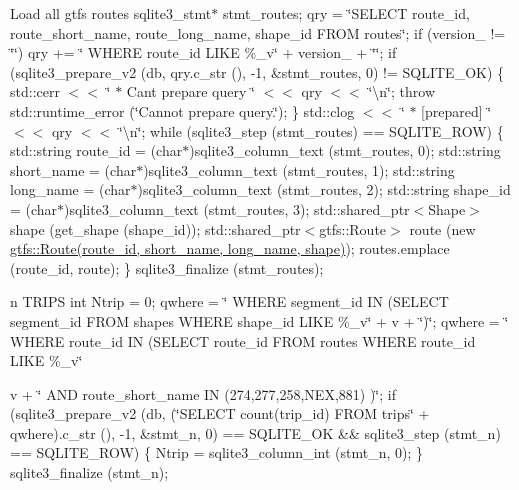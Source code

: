 Load all gtfs {\ttfamily routes} sqlite3\+\_\+stmt$\ast$ stmt\+\_\+routes; qry = \char`\"{}\+S\+E\+L\+E\+C\+T route\+\_\+id, route\+\_\+short\+\_\+name, route\+\_\+long\+\_\+name, shape\+\_\+id F\+R\+O\+M routes\char`\"{}; if (version\+\_\+ != \char`\"{}\char`\"{}) qry += \char`\"{} W\+H\+E\+R\+E route\+\_\+id L\+I\+K\+E \textquotesingle{}\%\+\_\+v\char`\"{} + version\+\_\+ + \char`\"{}\textquotesingle{}\char`\"{}; if (sqlite3\+\_\+prepare\+\_\+v2 (db, qry.\+c\+\_\+str (), -\/1, \&stmt\+\_\+routes, 0) != S\+Q\+L\+I\+T\+E\+\_\+\+OK) \{ std\+::cerr $<$$<$ \char`\"{} $\ast$ Can\textquotesingle{}t prepare query \char`\"{} $<$$<$ qry $<$$<$ \char`\"{}\textbackslash{}n\char`\"{}; throw std\+::runtime\+\_\+error (\char`\"{}\+Cannot prepare query.\char`\"{}); \} std\+::clog $<$$<$ \char`\"{} $\ast$ \mbox{[}prepared\mbox{]} \char`\"{} $<$$<$ qry $<$$<$ \char`\"{}\textbackslash{}n\char`\"{}; while (sqlite3\+\_\+step (stmt\+\_\+routes) == S\+Q\+L\+I\+T\+E\+\_\+\+R\+OW) \{ std\+::string route\+\_\+id = (char$\ast$)sqlite3\+\_\+column\+\_\+text (stmt\+\_\+routes, 0); std\+::string short\+\_\+name = (char$\ast$)sqlite3\+\_\+column\+\_\+text (stmt\+\_\+routes, 1); std\+::string long\+\_\+name = (char$\ast$)sqlite3\+\_\+column\+\_\+text (stmt\+\_\+routes, 2); std\+::string shape\+\_\+id = (char$\ast$)sqlite3\+\_\+column\+\_\+text (stmt\+\_\+routes, 3); std\+::shared\+\_\+ptr$<$\+Shape$>$ shape (get\+\_\+shape (shape\+\_\+id)); std\+::shared\+\_\+ptr$<$gtfs\+::\+Route$>$ route (new \hyperlink{classgtfs_1_1Route}{gtfs\+::\+Route(route\+\_\+id, short\+\_\+name, long\+\_\+name, shape)}); routes.\+emplace (route\+\_\+id, route); \} sqlite3\+\_\+finalize (stmt\+\_\+routes);

n T\+R\+I\+PS int Ntrip = 0; qwhere = \char`\"{} W\+H\+E\+R\+E segment\+\_\+id I\+N (\+S\+E\+L\+E\+C\+T segment\+\_\+id F\+R\+O\+M shapes W\+H\+E\+R\+E shape\+\_\+id L\+I\+K\+E \textquotesingle{}\%\+\_\+v\char`\"{} + v + \char`\"{}\textquotesingle{})\char`\"{}; qwhere = \char`\"{} W\+H\+E\+R\+E route\+\_\+id I\+N (\+S\+E\+L\+E\+C\+T route\+\_\+id F\+R\+O\+M routes W\+H\+E\+R\+E route\+\_\+id L\+I\+K\+E \textquotesingle{}\%\+\_\+v\char`\"{}
\begin{DoxyItemize}
\item v + \char`\"{}\textquotesingle{} A\+N\+D route\+\_\+short\+\_\+name I\+N (\textquotesingle{}274\textquotesingle{},\textquotesingle{}277\textquotesingle{},\textquotesingle{}258\textquotesingle{},\textquotesingle{}\+N\+E\+X\textquotesingle{},\textquotesingle{}881\textquotesingle{}) )\char`\"{}; if (sqlite3\+\_\+prepare\+\_\+v2 (db, (\char`\"{}\+S\+E\+L\+E\+C\+T count(trip\+\_\+id) F\+R\+O\+M trips\char`\"{} + qwhere).c\+\_\+str (), -\/1, \&stmt\+\_\+n, 0) == S\+Q\+L\+I\+T\+E\+\_\+\+OK \&\& sqlite3\+\_\+step (stmt\+\_\+n) == S\+Q\+L\+I\+T\+E\+\_\+\+R\+OW) \{ Ntrip = sqlite3\+\_\+column\+\_\+int (stmt\+\_\+n, 0); \} sqlite3\+\_\+finalize (stmt\+\_\+n);
\end{DoxyItemize}

